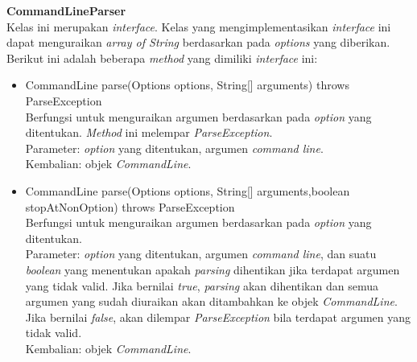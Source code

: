 \documentclass[a4paper,twoside]{article}
\begin{document}
\begin{enumerate}
\textbf{CommandLineParser}\\
Kelas ini merupakan \textit{interface}. Kelas yang mengimplementasikan \textit{interface} ini dapat menguraikan \textit{array of String} berdasarkan pada \textit{options} yang diberikan. Berikut ini adalah beberapa \textit{method} yang dimiliki \textit{interface} ini: 
\begin{itemize}
\item CommandLine parse(Options options, String[] arguments) throws ParseException\\
Berfungsi untuk menguraikan argumen berdasarkan pada \textit{option} yang ditentukan. \textit{Method} ini melempar \textit{ParseException}.\\
Parameter: \textit{option} yang ditentukan, argumen \textit{command line}.\\
Kembalian: objek \textit{CommandLine}.

\item CommandLine parse(Options options, String[] arguments,boolean stopAtNonOption) throws ParseException\\
Berfungsi untuk menguraikan argumen berdasarkan pada \textit{option} yang ditentukan.\\
Parameter: \textit{option} yang ditentukan, argumen \textit{command line}, dan suatu \textit{boolean} yang menentukan apakah \textit{parsing} dihentikan jika terdapat argumen yang tidak valid. Jika bernilai \textit{true}, \textit{parsing} akan dihentikan dan semua argumen yang sudah diuraikan akan ditambahkan ke objek \textit{CommandLine}. Jika bernilai \textit{false}, akan dilempar \textit{ParseException} bila terdapat argumen yang tidak valid.
\\
Kembalian: objek \textit{CommandLine}.
\end{itemize}


\end{enumerate}
\end{document}
